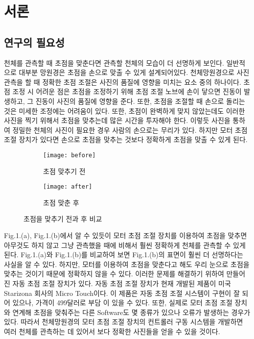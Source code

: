 \section{서론}

\subsection{연구의 필요성}

천체를 관측할 때 초점을 맞춘다면 관측할 천체의 모습이 더 선명하게 보인다. 일반적으로 대부분 망원경은 초점을 손으로 맞출 수 있게 설계되어있다. 천체망원경으로 사진 관측을 할 때 정확한 초점 조절은 사진의 품질에 영향을 미치는 요소 중의 하나이다. 초점 조정 시 어려운 점은 초점을 조정하기 위해 초점 조절 노브에 손이 닿으면 진동이 발생하고, 그 진동이 사진의 품질에 영향을 준다. 또한, 초점을 조절할 때 손으로 돌리는 것은 미세한 조정에는 어려움이 있다. 또한, 초점이 완벽하게 맞지 않았는데도 이러한 사진을 찍기 위해서 초점을 맞추는데 많은 시간을 투자해야 한다. 이렇듯 사진을 통하여 정밀한 천체의 사진이 필요한 경우 사람의 손으로는 무리가 있다. 하지만 모터 초점 조절 장치가 있다면 손으로 초점을 맞추는 것보다 정확하게 초점을 맞출 수 있게 된다. 
\begin{figure}[h]
	\begin{subfigure}{0.5\textwidth}
		\texttt{[image: before]} 
		\caption{초점 맞추기 전}
		\label{fig:before}
	\end{subfigure}
	\begin{subfigure}{0.5\textwidth}
		\texttt{[image: after]}
		\caption{초점 맞춘 후}
		\label{fig:after}
	\end{subfigure}
	\caption{초점을 맞추기 전과 후 비교}
	\label{fig:image1}
\end{figure}
Fig.1.(a), Fig.1.(b)에서 알 수 있듯이 모터 초점 조절 장치를 이용하여 초점을 맞추면 아무것도 하지 않고 그냥 관측했을 때에 비해서 훨씬 정확하게 천체를 관측할 수 있게 된다. Fig.1.(a)와 Fig.1.(b)를 비교하여 보면 Fig.1.(b)의 표면이 훨씬 더 선명하다는 사실을 알 수 있다. 하지만, 모터를 이용하여 초점을 맞춘다고 해도 우리 눈으로 초점을 맞추는 것이기 때문에 정확하지 않을 수 있다. 이러한 문제를 해결하기 위하여 만들어진 자동 초점 조절 장치가 있다. 자동 초점 조절 장치가 현재 개발된 제품이 미국 Starizona 회사의 Micro Touch이다. 이 제품은 자동 초점 조절 시스템이 구현이 잘 되어 있으나, 가격이 499달러로 부담 이 있을 수 있다. 또한, 실제로 모터 초점 조절 장치와 연계해 초점을 맞춰주는 다른 Software도 몇 종류가 있으나 오류가 발생하는 경우가 있다. 따라서 천체망원경의 모터 초점 조절 장치의 컨트롤러 구동 시스템을 개발하면 여러 천체를 관측하는 데 있어서 보다 정확한 사진들을 얻을 수 있을 것이다.

